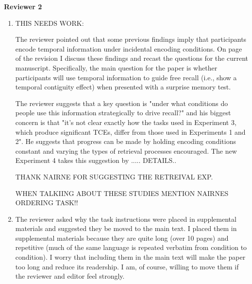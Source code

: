 \documentclass[12pt]{article}
\begin{document}
\textbf{\large{Reviewer 2}}

\begin{enumerate}

	\item 
	THIS NEEDS WORK:

	The reviewer pointed out that some previous findings imply that participants encode temporal information under incidental encoding conditions. On page \pageref{TODO-8} of the revision I discuss these findings and recast the questions for the current manuscript. Specifically, the main question for the paper is whether participants will use temporal information to guide free recall (i.e., show a temporal contiguity effect) when presented with a surprise memory test.

	The reviewer suggests that a key question is "under what conditions do people use this information strategically to drive recall?" and his biggest concern is that "it's not clear exactly how the tasks used in Experiment 3, which produce significant TCEs, differ from those used in Experiments 1 and 2". He suggests that progress can be made by holding encoding conditions constant and varying the types of retrieval processes encouraged. The new Experiment 4 takes this suggestion by ..... DETAILS..

	THANK NAIRNE FOR SUGGESTING THE RETREIVAL EXP. 

	WHEN TALKIING ABOUT THESE STUDIES MENTION NAIRNES ORDERING TASK!!

	\item
	The reviewer asked why the task instructions were placed in supplemental materials and suggested they be moved to the main text. I placed them in supplemental materials because they are quite long (over 10 pages) and repetitive (much of the same language is repeated verbatim from condition to condition). I worry that including them in the main text will make the paper too long and reduce its readership. I am, of course, willing to move them if the reviewer and editor feel strongly.


\end{enumerate}
\end{document}
